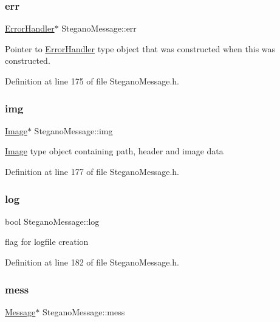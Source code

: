 \subsubsection{\texorpdfstring{err}{err}}
{\footnotesize\ttfamily \mbox{\hyperlink{classErrorHandler}{Error\+Handler}}$\ast$ Stegano\+Message\+::err\hspace{0.3cm}{\ttfamily [private]}}

Pointer to \mbox{\hyperlink{classErrorHandler}{Error\+Handler}} type object that was constructed when this was constructed. 

Definition at line 175 of file Stegano\+Message.\+h.

\mbox{\label{classSteganoMessage_acd7dba217d5df515d93ddf814734ecf4}} 
\subsubsection{\texorpdfstring{img}{img}}
{\footnotesize\ttfamily \mbox{\hyperlink{classImage}{Image}}$\ast$ Stegano\+Message\+::img\hspace{0.3cm}{\ttfamily [private]}}

\mbox{\hyperlink{classImage}{Image}} type object containing path, header and image data 

Definition at line 177 of file Stegano\+Message.\+h.

\mbox{\label{classSteganoMessage_a687c455d3f09eb5349e0358cb07aa21c}} 
\subsubsection{\texorpdfstring{log}{log}}
{\footnotesize\ttfamily bool Stegano\+Message\+::log\hspace{0.3cm}{\ttfamily [private]}}

flag for logfile creation 

Definition at line 182 of file Stegano\+Message.\+h.

\mbox{\label{classSteganoMessage_a64f70bbacb0662cebe764316658da35d}} 
\subsubsection{\texorpdfstring{mess}{mess}}
{\footnotesize\ttfamily \mbox{\hyperlink{classMessage}{Message}}$\ast$ Stegano\+Message\+::mess\hspace{0.3cm}{\ttfamily [private]}}

